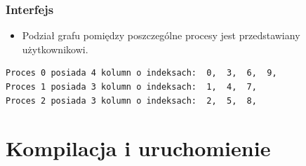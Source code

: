 \documentclass[10pt]{beamer}
\begin{document}

\begin{frame}[fragile]
\frametitle{Interfejs}
\begin{itemize}
\item Podział grafu pomiędzy poszczególne procesy jest przedstawiany użytkownikowi.
\end{itemize}
\begin{lstlisting}[basicstyle=\tiny]
Proces 0 posiada 4 kolumn o indeksach:  0,  3,  6,  9,
Proces 1 posiada 3 kolumn o indeksach:  1,  4,  7,
Proces 2 posiada 3 kolumn o indeksach:  2,  5,  8,
\end{lstlisting}

\end{frame}

\section{Kompilacja i uruchomienie}
\end{document}
